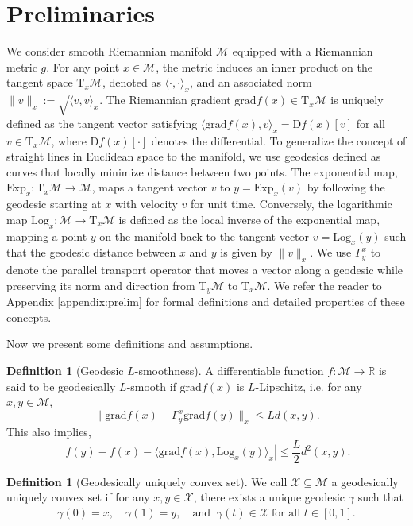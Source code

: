 \documentclass{article}
\newcommand{\rgrad}{\mathrm{grad}}
\newcommand{\Log}{\mathrm{Log}}
\theoremstyle{plain}
\theoremstyle{definition}
\newtheorem{definition}[theorem]{Definition}
\theoremstyle{remark}
\begin{document}
\section{Preliminaries}
We consider smooth Riemannian manifold $\mathcal{M}$ equipped with a Riemannian metric $g$. For any point $x \in \mathcal{M}$, the metric induces an inner product on the tangent space $\mathrm{T}_x \mathcal{M}$, denoted as $\langle \cdot, \cdot \rangle_x$, and an associated norm $\|v\|_x := \sqrt{\langle v, v \rangle_x}$. The Riemannian gradient $\mathrm{grad} f(x) \in \mathrm{T}_x \mathcal{M}$ is uniquely defined as the tangent vector satisfying $\langle \mathrm{grad} f(x), v \rangle_x = \mathrm{D}f(x)[v]$ for all $v \in \mathrm{T}_x \mathcal{M}$, where $\mathrm{D}f(x)[\cdot]$ denotes the differential. To generalize the concept of straight lines in Euclidean space to the manifold, we use geodesics defined as curves that locally minimize distance between two points. The exponential map, $\mathrm{Exp}_x: \mathrm{T}_x \mathcal{M} \to \mathcal{M}$, maps a tangent vector $v$ to $y = \mathrm{Exp}_x(v)$ by following the geodesic starting at $x$ with velocity $v$ for unit time. Conversely, the logarithmic map $\mathrm{Log}_x: \mathcal{M} \to \mathrm{T}_x \mathcal{M}$ is defined as the local inverse of the exponential map, mapping a point $y$ on the manifold back to the tangent vector $v = \mathrm{Log}_x(y)$ such that the geodesic distance between $x$ and $y$ is given by $\|v\|_x$. We use $\Gamma^x_y$ to denote the parallel transport operator that moves a vector along a geodesic while preserving its norm and direction from $\mathrm{T}_y \mathcal{M}$ to $\mathrm{T}_x \mathcal{M}$. 
We refer the reader to Appendix \ref{appendix:prelim} for formal definitions and detailed properties of these concepts.


Now we present some definitions and assumptions. 

\begin{definition}[Geodesic $L$-smoothness]\label{as:lipgrad}
A differentiable function $f : \mathcal{M} \to \mathbb{R}$ is said to be geodesically $L$-smooth if $\rgrad f(x)$ is $L$-Lipschitz, i.e. for any $x, y \in \mathcal{M}$,
\begin{equation*}
\|\rgrad f(x) - \Gamma^x_y \rgrad f(y)\|_x \leq L d(x, y).
\end{equation*}
This also implies, 
\[    |f(y) - f(x) - \langle \rgrad f(x), \Log_x(y) \rangle_x| \leq \frac{L}{2} d^2(x, y).
\]
\end{definition}

\begin{definition}[Geodesically uniquely convex set]\label{def:geodesically_uniquelly_convex_set} 
We call $\mathcal{X}\subseteq \mathcal{M}$ a geodesically uniquely convex set if for any $x,y\in \mathcal{X}$, there exists a unique geodesic $\gamma$ such that 
\begin{align*}
\gamma(0) = x, \quad 
\gamma(1) = y, \quad 
\text{and }~ \gamma(t)\in \mathcal{X}~\text{for all } t\in[0,1].
\end{align*}
\end{definition}
\end{document}
